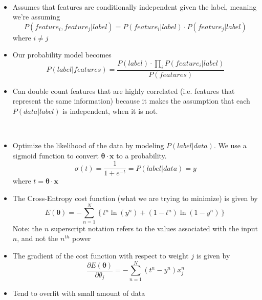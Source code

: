 \documentclass[12pt]{article}
\newenvironment{concept}[1]{\begin{trivlist}
		\item[\hskip \labelsep {\bfseries #1}]}{\end{trivlist}}
\begin{document}
\begin{concept}{Naive Bayes}
	\
	\begin{itemize}
		\item {
			Assumes that features are conditionally independent given the label, meaning we're assuming
			$$P(feature_i, feature_j | label) = P(feature_i | label) \cdot P(feature_j | label)$$
			where $i \neq j$
		}
		\item {
			Our probability model becomes
			$$P(label | features) = \frac{P(label) \cdot \prod_{i}^{} P(feature_i | label)}{P(features)}$$
		}
		\item {
			Can double count features that are highly correlated (i.e. features that represent the same information) because it makes
			the assumption that each $P(data | label)$ is independent, when it is not.
		}
	\end{itemize}
\end{concept}

\begin{concept}{Logistic Regression}
	\
	\begin{itemize}
		\item {
			Optimize the likelihood of the data by modeling $P(label | data)$. We use a sigmoid function to convert $ \boldsymbol{\theta} \cdot \boldsymbol{x}$ to a probability.
			$$\sigma(t) = \frac{1}{1 + e^{-t}} = P(label | data) = y$$
			where $t = \boldsymbol{\theta} \cdot \boldsymbol{x}$
		}
		\item {
			The Cross-Entropy cost function (what we are trying to minimize) is given by
			$$E(\boldsymbol{\theta}) = - \sum_{n=1}^{N} \left\{ t^n \ln(y^n) + (1-t^n) \ln(1-y^n) \right\}$$
			Note: the $n$ superscript notation refers to the values associated with the input $n$, and not the $n^{th}$ power
		}
		\item {
			The gradient of the cost function with respect to weight $j$ is given by
			$$\frac{\partial E(\boldsymbol{\theta})}{\partial \theta_j} = - \sum_{n=1}^{N} (t^n - y^n) x_j^n$$
		}
		\item {
			Tend to overfit with small amount of data
		}
	\end{itemize}
\end{concept}
\end{document}
